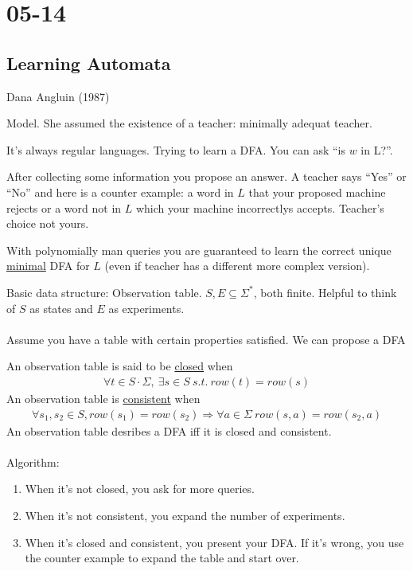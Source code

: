 \documentclass[../598comp.tex]{subfiles}
\date{05-14}
\begin{document}
\section{05-14}

\subsection{Learning Automata}

Dana Angluin (1987)

Model.  She assumed the existence of a teacher: minimally adequat teacher.

It's always regular languages. Trying to learn a DFA. You can ask ``is $w$ in
L?''.

After collecting some information you propose an answer. A teacher says ``Yes''
or ``No'' and here is a counter example: a word in $L$ that your proposed machine
rejects or a word not in $L$ which your machine incorrectlys accepts. Teacher's
choice not yours.

\begin{theorem}
  With polynomially man queries you are guaranteed to learn the correct unique
  \ul{minimal} DFA for $L$ (even if teacher has a different more complex version).  
\end{theorem}

Basic data structure: Observation table. $S, E \subseteq \Sigma^*$, both finite.
Helpful to think of $S$ as states and $E$ as experiments.
\\\\
Assume you have a table with certain properties satisfied. We can propose a DFA

An observation table is said to be \ul{closed} when
\begin{gather*}
  \forall t \in S \cdot \Sigma, \ \exists s \in S \ s.t. \ row(t) = row(s)
\end{gather*}
An observation table is \ul{consistent} when
\begin{gather*}
  \forall s_1, s_2 \in S, row(s_1) = row(s_2) \Rightarrow \forall a \in \Sigma \
  row(s, a) = row(s_2, a)
\end{gather*}
An observation table desribes a DFA iff it is closed and consistent.
\\\\
Algorithm:
\begin{enumerate}
\item 
  When it's not closed, you ask for more queries.
\item
  When it's not consistent, you expand the number of experiments.
\item
  When it's closed and consistent, you present your DFA. If it's wrong, you use
  the counter example to expand the table and start over.
\end{enumerate}
\end{document}
